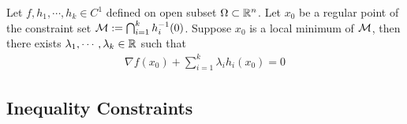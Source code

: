 \documentclass{article}
\begin{document}
   	\begin{theorem}
   		Let $f, h_1, \cdots, h_k \in C^1$ defined on open subset $\Omega \subset \mathbb{R}^n$. Let $x_0$ be a regular point of the constraint set $\mathcal{{M}} := \bigcap_{i=1}^k h^{-1}_i(0)$. Suppose $x_0$ is a local minimum of $\mathcal{{M}}$, then there exists $\lambda_1, \cdots, \lambda_k \in \mathbb{R}$ such that
   		\begin{align}
   			\nabla f(x_0) + \sum_{i=1}^k \lambda_i h_i(x_0) = 0
   		\end{align}
   	\end{theorem}
   	
   	\subsection{Inequality Constraints}
\end{document}
